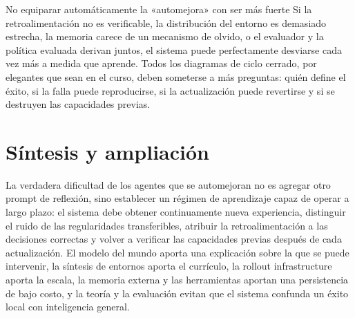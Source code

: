 \documentclass[a4paper]{article}
\begin{document}
\begin{warningbox}{No equiparar automáticamente la «automejora» con ser más fuerte}
Si la retroalimentación no es verificable, la distribución del entorno es demasiado estrecha, la memoria carece de un mecanismo de olvido, o el evaluador y la política evaluada derivan juntos, el sistema puede perfectamente desviarse cada vez más a medida que aprende. Todos los diagramas de ciclo cerrado, por elegantes que sean en el curso, deben someterse a más preguntas: quién define el éxito, si la falla puede reproducirse, si la actualización puede revertirse y si se destruyen las capacidades previas.
\end{warningbox}

\section{Síntesis y ampliación}

La verdadera dificultad de los agentes que se automejoran no es agregar otro prompt de reflexión, sino establecer un régimen de aprendizaje capaz de operar a largo plazo: el sistema debe obtener continuamente nueva experiencia, distinguir el ruido de las regularidades transferibles, atribuir la retroalimentación a las decisiones correctas y volver a verificar las capacidades previas después de cada actualización. El modelo del mundo aporta una explicación sobre la que se puede intervenir, la síntesis de entornos aporta el currículo, la rollout infrastructure aporta la escala, la memoria externa y las herramientas aportan una persistencia de bajo costo, y la teoría y la evaluación evitan que el sistema confunda un éxito local con inteligencia general.
\end{document}
